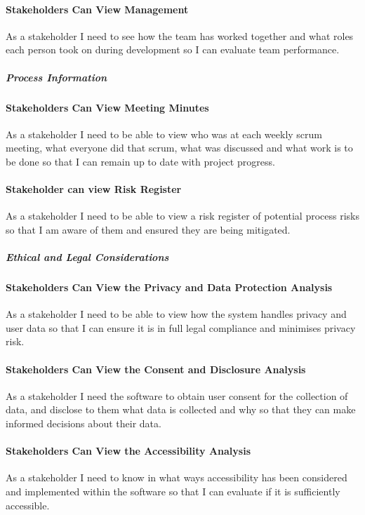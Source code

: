 \paragraph{Stakeholders Can View Management}
As a stakeholder I need to see how the team has worked together and what roles each person took on during development so I can evaluate team performance.

\subparagraph{Process Information}

\paragraph{Stakeholders Can View Meeting Minutes}
As a stakeholder I need to be able to view who was at each weekly scrum meeting, what everyone did that scrum, what was discussed and what work is to be done so that I can remain up to date with project progress.

\paragraph{Stakeholder can view Risk Register}
As a stakeholder I need to be able to view a risk register of potential process risks so that I am aware of them and ensured they are being mitigated.

\subparagraph{Ethical and Legal Considerations}

\paragraph{Stakeholders Can View the Privacy and Data Protection Analysis}
As a stakeholder I need to be able to view how the system handles privacy and user data so that I can ensure it is in full legal compliance and minimises privacy risk.

\paragraph{Stakeholders Can View the Consent and Disclosure Analysis}
As a stakeholder I need the software to obtain user consent for the collection of data, and disclose to them what data is collected and why so that they can make informed decisions about their data.

\paragraph{Stakeholders Can View the Accessibility Analysis}
As a stakeholder I need to know in what ways accessibility has been considered and implemented within the software so that I can evaluate if it is sufficiently accessible.


